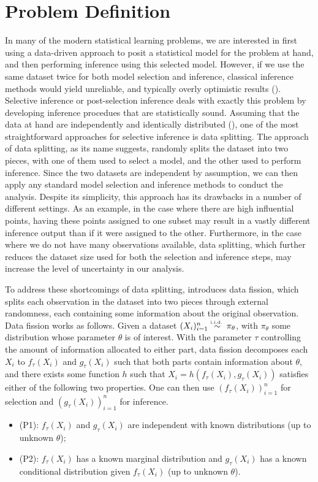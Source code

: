 \section{Problem Definition}\label{sec:problem_def}
In many of the modern statistical learning problems, we are interested in first using a data-driven approach to posit a statistical model for the problem at hand, and then performing inference using this selected model. However, if we use the same dataset twice for both model selection and inference, classical inference methods would yield unreliable, and typically overly optimistic results (\cite{hong2018overfitting}). Selective inference or post-selection inference deals with exactly this problem by developing inference procedues that are statistically sound. Assuming that the data at hand are independently and identically distributed (\iid), one of the most straightforward approaches for selective inference is data splitting. The approach of data splitting, as its name suggests, randomly splits the dataset into two pieces, with one of them used to select a model, and the other used to perform inference. Since the two datasets are independent by assumption, we can then apply any standard model selection and inference methods to conduct the analysis. Despite its simplicity, this approach has its drawbacks in a number of different settings. As an example, in the case where there are high influential points, having these points assigned to one subset may result in a vastly different inference output than if it were assigned to the other. Furthermore, in the case where we do not have many observations available, data splitting, which further reduces the dataset size used for both the selection and inference steps, may increase the level of uncertainty in our analysis.

To address these shortcomings of data splitting, \cite{leiner2022data} introduces data fission, which splits each observation in the dataset into two pieces through external randomness, each containing some information about the original observation. Data fission works as follows. Given a dataset $(X_i)_{i=1}^n \overset{\textrm{\tiny i.i.d.\ }}{\sim} \pi_\theta$, with $\pi_\theta$ some distribution whose parameter $\theta$ is of interest. With the parameter $\tau$ controlling the amount of information allocated to either part, data fission decomposes each $X_i$ to $f_\tau(X_i)$ and $g_\tau(X_i)$ such that both parts contain information about $\theta$, and there exists some function $h$ such that $X_i = h(f_\tau(X_i), g_\tau(X_i))$ satisfies either of the following two properties. One can then use $\left(f_\tau(X_i)\right)_{i=1}^n$ for selection and $\left(g_\tau(X_i)\right)_{i=1}^n$ for inference.
\begin{itemize}
\item (P1): $f_\tau(X_i)$ and $g_\tau(X_i)$ are independent with known distributions (up to unknown $\theta$);
\item (P2): $f_\tau(X_i)$ has a known marginal distribution and $g_\tau(X_i)$ has a known conditional distribution given $f_\tau(X_i)$ (up to unknown $\theta$).
\end{itemize}

